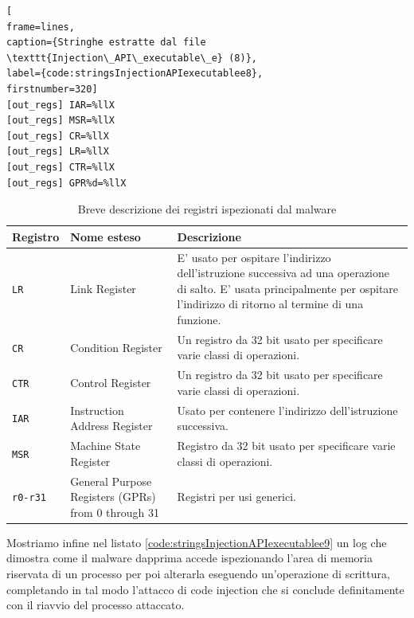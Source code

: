 \documentclass[10pt,a4paper, titlepage]{report}
\begin{document}
\begin{lstlisting}[
frame=lines, 
caption={Stringhe estratte dal file \texttt{Injection\_API\_executable\_e} (8)}, 
label={code:stringsInjectionAPIexecutablee8},
firstnumber=320]
[out_regs] IAR=%llX
[out_regs] MSR=%llX
[out_regs] CR=%llX
[out_regs] LR=%llX
[out_regs] CTR=%llX
[out_regs] GPR%d=%llX
\end{lstlisting}

\begin{table}[h!]
    \caption{Breve descrizione dei registri ispezionati dal malware}
    \centering
    \begin{adjustbox}{center=\textwidth}
    \label{tab:PowerPCRegister}
    
    \begin{tabular}{l|l|p{8cm}}
      \toprule
      Registro & Nome esteso & Descrizione \\
      \midrule
      \texttt{LR} & Link Register & E' usato per ospitare l'indirizzo dell'istruzione successiva ad una operazione di salto. E' usata principalmente per ospitare l'indirizzo di ritorno al termine di una funzione. \\
      
      \texttt{CR} & Condition Register & Un registro da 32 bit usato per specificare varie classi di operazioni.\\
      
      \texttt{CTR} & Control Register & Un registro da 32 bit usato per specificare varie classi di operazioni.\\
      
      \texttt{IAR} & Instruction Address Register & Usato per contenere l'indirizzo dell'istruzione successiva.\\
      
      \texttt{MSR} & Machine State Register & Registro da 32 bit usato per specificare varie classi di operazioni.\\
     
	\texttt{r0-r31} & General Purpose Registers (GPRs) from 0 through 31 & Registri per usi generici. \\   
     
      \bottomrule
    \end{tabular}
    \end{adjustbox}
\end{table}

Mostriamo infine nel listato \ref{code:stringsInjectionAPIexecutablee9} un log che dimostra come il malware dapprima accede ispezionando l'area di memoria riservata di un processo per poi alterarla eseguendo un'operazione di scrittura, completando in tal modo l'attacco di code injection che si conclude definitamente con il riavvio del processo attaccato.
\end{document}

